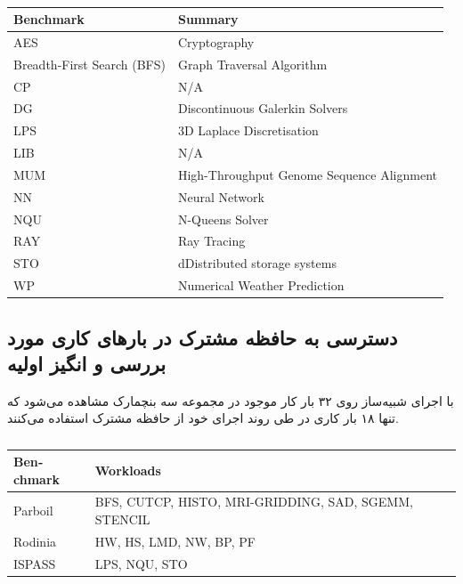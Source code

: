 \documentclass{thesis}
\begin{document}
\begin{center}
\begin{table}[h!]
\begin{latin}
\begin{tabular}{|p{}|p{}|}
\hline
Benchmark & Summary \\
\hline
AES & Cryptography \\
\hline
Breadth-First Search (BFS) & Graph Traversal Algorithm \\
\hline
CP & N/A \\
\hline
DG & Discontinuous Galerkin Solvers \\
\hline
LPS & 3D Laplace Discretisation \\
\hline
LIB & N/A \\
\hline
MUM & High-Throughput Genome Sequence Alignment \\
\hline
NN & Neural Network \\
\hline
NQU & N-Queens Solver \\
\hline
RAY & Ray Tracing \\
\hline
STO & dDistributed storage systems \\
\hline
WP & Numerical Weather Prediction \\
\hline
\end{tabular}
\end{latin}
\caption{%
}
\label{table:ispassbenchmarks}
\end{table}
\end{center}

\subsection{%
دسترسی به حافظه مشترک در بارهای کاری مورد بررسی و انگیز اولیه
}

با اجرای شبیه‌ساز روی ۳۲ بار کار موجود در مجموعه سه بنچمارک مشاهده می‌شود که
تنها ۱۸ بار کاری در طی روند اجرای خود از حافظه مشترک استفاده می‌کنند.

\begin{center}
\begin{table}[h!]
\begin{latin}
\begin{tabular}{|p{}|p{}|}
\hline
Benchmark & Workloads \\
\hline
Parboil & BFS, CUTCP, HISTO, MRI-GRIDDING, SAD, SGEMM, STENCIL \\
\hline
Rodinia & HW, HS, LMD, NW, BP, PF \\
\hline
ISPASS & LPS, NQU, STO \\
\hline
\end{tabular}
\end{latin}
\caption{%
}
\label{table:sharedmemorybenchmarks}
\end{table}
\end{center}
\end{document}
